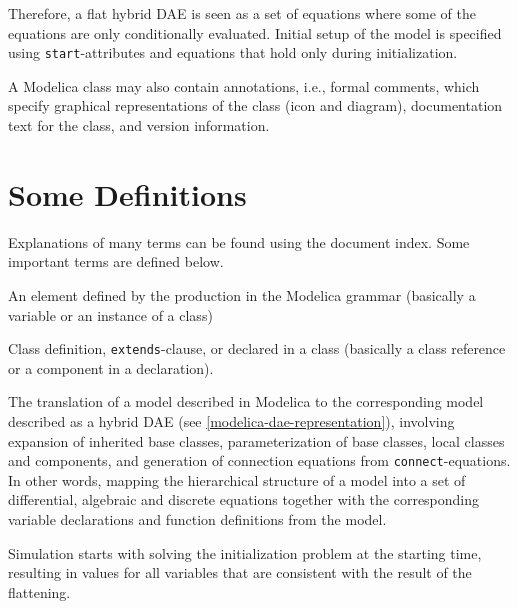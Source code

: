 Therefore, a flat hybrid DAE is seen as a set of equations where some of the equations are only conditionally evaluated.
Initial setup of the model is specified using \lstinline!start!-attributes and equations that hold only during initialization.

A Modelica class may also contain annotations, i.e., formal comments, which specify graphical representations of the class (icon and diagram), documentation text for the class, and version information.

\section{Some Definitions}\label{some-definitions}

Explanations of many terms can be found using the document index.
Some important terms are defined below.

\begin{definition}[Component]
An element defined by the production  in the Modelica grammar (basically a variable or an instance of a class)
\end{definition}

\begin{definition}[Element]
Class definition, \lstinline!extends!-clause, or  declared in a class (basically a class reference or a component in a declaration).
\end{definition}

\begin{definition}[Flattening]
The translation of a model described in Modelica to the corresponding model described as a hybrid DAE (see \cref{modelica-dae-representation}), involving expansion of inherited base classes, parameterization of base classes, local classes and components, and generation of connection equations from \lstinline!connect!-equations.
In other words, mapping the hierarchical structure of a model into a set of differential, algebraic and discrete equations together with the corresponding variable declarations and function definitions from the model.
\end{definition}

\begin{definition}[Initialization]
Simulation starts with solving the initialization problem at the starting time, resulting in values for all variables that are consistent with the result of the flattening.
\end{definition}

